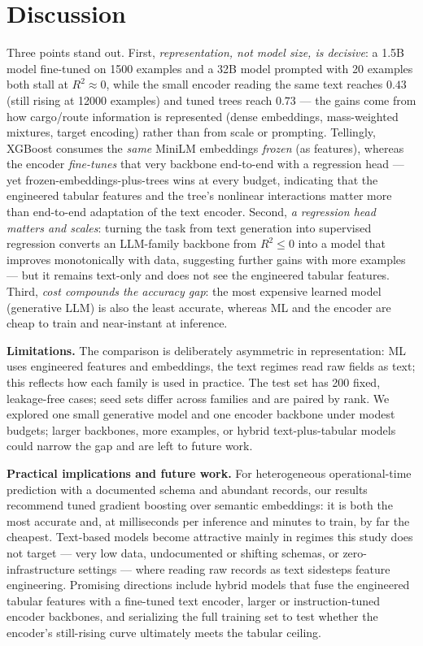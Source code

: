 \documentclass[kdmile,a4paper]{kdmile}
\begin{document}
\section{Discussion}
Three points stand out. First, \emph{representation, not model size, is decisive}: a 1.5B model fine-tuned on 1500 examples and a 32B model prompted with 20 examples both stall at $R^2\approx0$, while the small encoder reading the same text reaches $0.43$ (still rising at 12000 examples) and tuned trees reach $0.73$ --- the gains come from how cargo/route information is represented (dense embeddings, mass-weighted mixtures, target encoding) rather than from scale or prompting. Tellingly, XGBoost consumes the \emph{same} MiniLM embeddings \emph{frozen} (as features), whereas the encoder \emph{fine-tunes} that very backbone end-to-end with a regression head --- yet frozen-embeddings-plus-trees wins at every budget, indicating that the engineered tabular features and the tree's nonlinear interactions matter more than end-to-end adaptation of the text encoder. Second, \emph{a regression head matters and scales}: turning the task from text generation into supervised regression converts an LLM-family backbone from $R^2\le0$ into a model that improves monotonically with data, suggesting further gains with more examples --- but it remains text-only and does not see the engineered tabular features. Third, \emph{cost compounds the accuracy gap}: the most expensive learned model (generative LLM) is also the least accurate, whereas ML and the encoder are cheap to train and near-instant at inference.

\noindent\textbf{Limitations.} The comparison is deliberately asymmetric in representation: ML uses engineered features and embeddings, the text regimes read raw fields as text; this reflects how each family is used in practice. The test set has 200 fixed, leakage-free cases; seed sets differ across families and are paired by rank. We explored one small generative model and one encoder backbone under modest budgets; larger backbones, more examples, or hybrid text-plus-tabular models could narrow the gap and are left to future work.

\noindent\textbf{Practical implications and future work.} For heterogeneous operational-time prediction with a documented schema and abundant records, our results recommend tuned gradient boosting over semantic embeddings: it is both the most accurate and, at milliseconds per inference and minutes to train, by far the cheapest. Text-based models become attractive mainly in regimes this study does not target --- very low data, undocumented or shifting schemas, or zero-infrastructure settings --- where reading raw records as text sidesteps feature engineering. Promising directions include hybrid models that fuse the engineered tabular features with a fine-tuned text encoder, larger or instruction-tuned encoder backbones, and serializing the full training set to test whether the encoder's still-rising curve ultimately meets the tabular ceiling.
\end{document}
